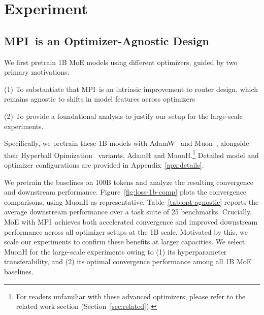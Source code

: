 \documentclass[11pt]{article}
\newcommand{\name}{MPI}
\begin{document}
\section{Experiment}
\subsection{\name\ is an Optimizer-Agnostic Design}
We first pretrain 1B MoE models using different optimizers, guided by two primary motivations:

(1) To substantiate that \name\ is an intrinsic improvement to router design, which remains agnostic to shifts in model features across optimizers

(2) To provide a foundational analysis to justify our setup for the large-scale experiments.

Specifically, we pretrain these 1B models with AdamW~\cite{adamw} and Muon~\cite{muon}, alongside their Hyperball Opimization~\cite{hyperball} variants, AdamH and MuonH.\footnote{For readers unfamiliar with these advanced optimizers, please refer to the related work section (Section~\ref{sec:related}).}
Detailed model and optimizer configurations are provided in Appendix~\ref{apx:details}.


We pretrain the baselines on 100B tokens and analyze the resulting convergence and downstream performance.
Figure~\ref{fig:loss-1b-comp} plots the convergence comparisons, using MuonH as representative.
Table~\ref{tab:opt-agnostic} reports the average downstream performance over a task suite of 25 benchmarks.
Crucially, MoE with \name\ achieves both accelerated convergence and improved downstream performance across all optimizer setups at the 1B scale. 
Motivated by this, we scale our experiments to confirm these benefits at larger capacities. 
We select MuonH for the large-scale experiments owing to 
(1) its  hyperparameter transferability, 
and (2) its optimal convergence performance among all 1B MoE baselines.
\end{document}
